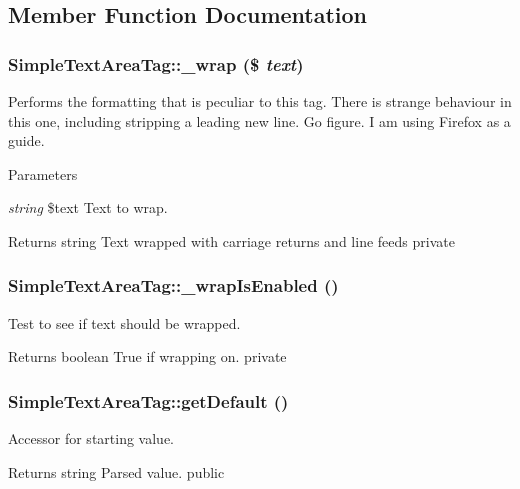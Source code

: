 \subsection{Member Function Documentation}
\hypertarget{class_simple_text_area_tag_a9bfa978f5170d9a10ec62d83c5460258}{
\subsubsection[{\_\-wrap}]{\setlength{\rightskip}{0pt plus 5cm}SimpleTextAreaTag::\_\-wrap (\$ {\em text})}}
\label{class_simple_text_area_tag_a9bfa978f5170d9a10ec62d83c5460258}
Performs the formatting that is peculiar to this tag. There is strange behaviour in this one, including stripping a leading new line. Go figure. I am using Firefox as a guide. 
\begin{DoxyParams}{Parameters}
\item[{\em string}]\$text Text to wrap. \end{DoxyParams}
\begin{DoxyReturn}{Returns}
string Text wrapped with carriage returns and line feeds  private 
\end{DoxyReturn}
\hypertarget{class_simple_text_area_tag_a1e2a78176ee9179f70c0a7e7b4a6e103}{
\subsubsection[{\_\-wrapIsEnabled}]{\setlength{\rightskip}{0pt plus 5cm}SimpleTextAreaTag::\_\-wrapIsEnabled ()}}
\label{class_simple_text_area_tag_a1e2a78176ee9179f70c0a7e7b4a6e103}
Test to see if text should be wrapped. \begin{DoxyReturn}{Returns}
boolean True if wrapping on.  private 
\end{DoxyReturn}
\hypertarget{class_simple_text_area_tag_af6b231753b32277ea079a1c55355a27a}{
\subsubsection[{getDefault}]{\setlength{\rightskip}{0pt plus 5cm}SimpleTextAreaTag::getDefault ()}}
\label{class_simple_text_area_tag_af6b231753b32277ea079a1c55355a27a}
Accessor for starting value. \begin{DoxyReturn}{Returns}
string Parsed value.  public 
\end{DoxyReturn}


